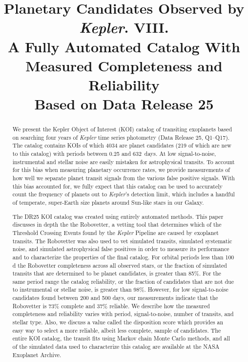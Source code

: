 \documentclass[twocolumn,tighten]{aastex61}
\renewcommand{\_}{\discretionary{\underscore}{}{\underscore}}  %
\newcommand\Kepler{\textit{Kepler}}
\begin{document}

\title{Planetary Candidates Observed by \Kepler. VIII.\\
A Fully Automated Catalog With Measured Completeness and Reliability\\Based on Data Release 25 }



\begin{abstract}
We present the Kepler Object of Interest (KOI) catalog of transiting exoplanets based on searching four years of \Kepler{} time series photometry (Data Release 25, Q1--Q17). The catalog contains \nkoisdr{} KOIs of which 4034 are planet candidates (219 of which are new to this catalog) with periods between 0.25 and 632~days.  At low signal-to-noise, instrumental and stellar noise are easily mistaken for astrophysical transits. To account for this bias when measuring planetary occurrence rates, we provide measurements of how well we separate planet transit signals from the various false positive signals. With this bias accounted for, we fully expect that this catalog can be used to accurately count the frequency of planets out to \Kepler{'s} detection limit, which includes a handful of temperate, super-Earth size planets around Sun-like stars in our Galaxy.

The DR25 KOI catalog was created using entirely automated methods. This paper discusses in depth the the Robovetter, a vetting tool that determines which of the \ntces{} Threshold Crossing Events found by the \Kepler{} Pipeline \citep{Twicken2016} are caused by exoplanet transits.  The Robovetter was also used to vet simulated transits, simulated systematic noise, and simulated astrophysical false positives in order to measure its performance and to characterize the properties of the final catalog. For orbital periods less than 100\,d the Robovetter completeness across all observed stars, or the fraction of simulated transits that are determined to be planet candidates, is greater than 85\%. For the same period range the catalog reliability, or the fraction of candidates that are not due to instrumental or stellar noise, is greater than 98\%.  However, for low signal-to-noise candidates found between 200 and 500 days, our measurements indicate that the Robovetter is 73\% complete and 37\% reliable. We describe how the measured completeness and reliability varies with period, signal-to-noise, number of transits, and stellar type.  Also, we discuss a value called the disposition score which provides an easy way to select a more reliable, albeit less complete, sample of candidates. The entire KOI catalog, the transit fits using Markov chain Monte Carlo methods, and all of the simulated data used to characterize this catalog are available at the NASA Exoplanet Archive.


\end{abstract}
\end{document}
